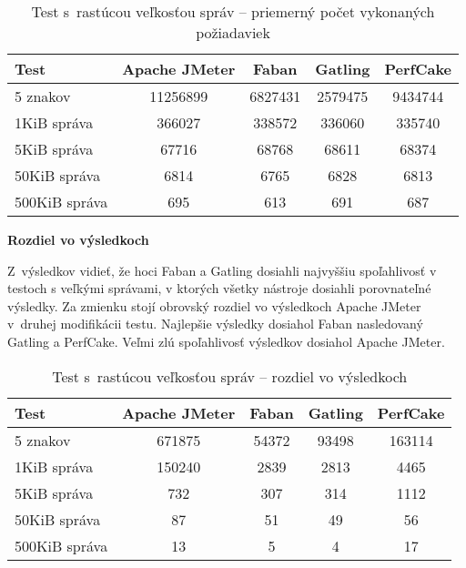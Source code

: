 \documentclass[12pt,oneside,final]{fithesis-utf8}
\begin{document}
\begin{itemize}
\begin{table}[H]
\begin{center}
\begin{tabular}{ | l | c | c | c | c |}
		\hline
		 \textbf{Test} & \textbf{Apache JMeter} & \textbf{Faban} & \textbf{Gatling} & \textbf{PerfCake} \\ \hline
		 5 znakov & 11256899 & 6827431 & 2579475 & 9434744 \\ \hline
 		 1KiB správa & 366027 & 338572 & 336060 & 335740 \\ \hline
 		 5KiB správa & 67716 & 68768 & 68611 & 68374 \\ \hline
 		 50KiB správa & 6814 & 6765 & 6828 & 6813 \\ \hline
		 500KiB správa & 695 & 613 & 691 & 687 \\ \hline
		 
\end{tabular}
\end{center}
\caption{Test s~rastúcou veľkosťou správ -- priemerný počet vykonaných požiadaviek}
\end{table}

\textbf{Rozdiel vo výsledkoch}

Z~výsledkov vidieť, že hoci Faban a Gatling dosiahli najvyššiu spoľahlivosť v testoch s veľkými správami, v ktorých všetky nástroje dosiahli porovnateľné výsledky. Za zmienku stojí obrovský rozdiel vo výsledkoch Apache JMeter v~druhej modifikácii testu. Najlepšie výsledky dosiahol Faban nasledovaný Gatling a PerfCake. Veľmi zlú spoľahlivosť výsledkov dosiahol Apache JMeter.

\begin{table}[H]
\begin{center}
\begin{tabular}{ | l | c | c | c | c |}
		\hline
		 \textbf{Test} & \textbf{Apache JMeter} & \textbf{Faban} & \textbf{Gatling} & \textbf{PerfCake} \\ \hline
		 5 znakov & 671875 & 54372 & 93498 & 163114 \\ \hline
		 1KiB správa & 150240 & 2839 & 2813 & 4465 \\ \hline
		 5KiB správa & 732 & 307 & 314 & 1112 \\ \hline
		 50KiB správa & 87 & 51 & 49 & 56 \\ \hline
		 500KiB správa & 13 & 5 & 4 & 17 \\ \hline
		 
\end{tabular}
\end{center}
\caption{Test s~rastúcou veľkosťou správ -- rozdiel vo výsledkoch}
\end{table}

\end{itemize}
\end{document}
